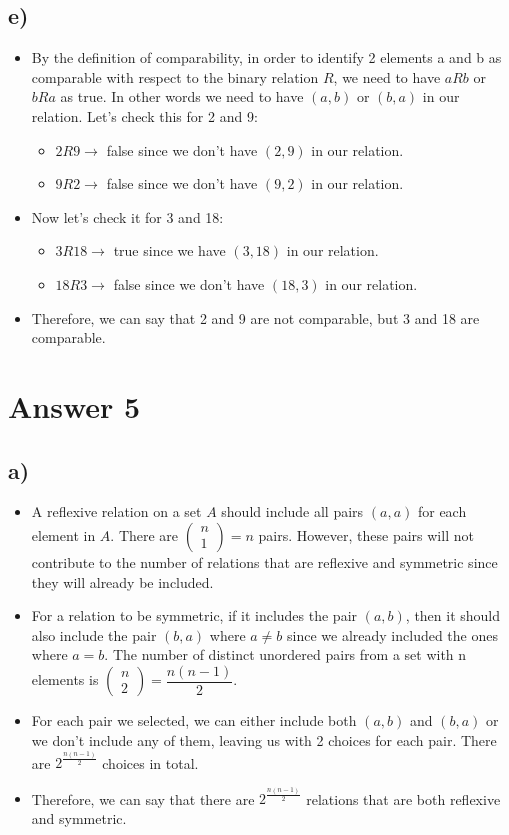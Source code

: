 \documentclass[12pt]{article}
\begin{document}
\subsection*{e)}
\begin{itemize}
 \item By the definition of comparability, in order to identify 2 elements a and b as comparable with respect to the binary relation $R$, we need to have $aRb$ or $bRa$ as true. In other words we need to have $(a,b)$ or $(b,a)$ in our relation. Let's check this for 2 and 9:
 \begin{itemize}
  \item $2R9 \rightarrow$ false since we don't have $(2,9)$ in our relation.
  \item $9R2 \rightarrow$ false since we don't have $(9,2)$ in our relation.
 \end{itemize}
 \item Now let's check it for 3 and 18:
 \begin{itemize}
  \item $3R18 \rightarrow$ true since we have $(3,18)$ in our relation.
  \item $18R3 \rightarrow$ false since we don't have $(18,3)$ in our relation.
 \end{itemize}
 \item Therefore, we can say that 2 and 9 are not comparable, but 3 and 18 are comparable.
\end{itemize}


\section*{Answer 5}
\subsection*{a)}
\begin{itemize}
 \item A reflexive relation on a set $A$ should include all pairs $(a,a)$ for each element in $A$. There are $\begin{pmatrix} n\\1 \end{pmatrix} = n$ pairs. However, these pairs will not contribute to the number of relations that are reflexive and symmetric since they will already be included.
 \item For a relation to be symmetric, if it includes the pair $(a,b)$, then it should also include the pair $(b,a)$ where $a \neq b$ since we already included the ones where $a = b$. The number of distinct unordered pairs from a set with n elements is $\begin{pmatrix} n\\2 \end{pmatrix} = \dfrac{n(n-1)}{2}$.
 \item For each pair we selected, we can either include both $(a,b)$ and $(b,a)$ or we don't include any of them, leaving us with 2 choices for each pair. There are $2^{\frac{n(n-1)}{2}}$ choices in total.
 \item Therefore, we can say that there are $2^{\frac{n(n-1)}{2}}$ relations that are both reflexive and symmetric.
\end{itemize}
\end{document}
